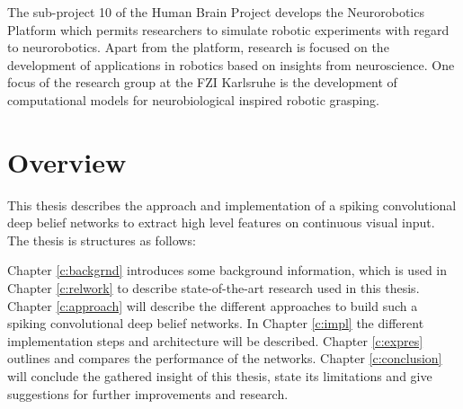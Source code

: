 The sub-project 10 of the Human Brain Project develops the Neurorobotics Platform which
permits researchers to simulate robotic experiments with regard to neurorobotics. Apart from the
platform, research is focused on the development of applications in robotics based on insights
from neuroscience. One focus of the research group at the FZI Karlsruhe is the development of
computational models for neurobiological inspired robotic grasping.


\section{Overview} \label{c:overw}

This thesis describes the approach and implementation of a spiking convolutional deep belief networks to extract high level features on continuous visual input. The thesis is structures as follows:

Chapter \ref{c:backgrnd} introduces some background information, which is used in Chapter \ref{c:relwork} to describe state-of-the-art research used in this thesis. 
Chapter \ref{c:approach} will describe the different approaches to build such a spiking convolutional deep belief networks. 
In Chapter \ref{c:impl} the different implementation steps and  architecture will be described. 
Chapter \ref{c:expres} outlines and compares the performance of the networks. 
Chapter  \ref{c:conclusion} will conclude the gathered insight of this thesis, state its limitations and give suggestions for further improvements and research.  